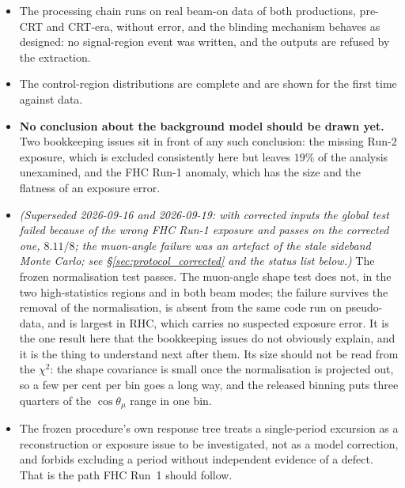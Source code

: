 \documentclass[11pt,a4paper]{article}
\begin{document}
\begin{itemize}\itemsep3pt
  \item The processing chain runs on real beam-on data of both productions, pre-CRT and
    CRT-era, without error, and the blinding mechanism behaves as designed: no
    signal-region event was written, and the outputs are refused by the extraction.
  \item The control-region distributions are complete and are shown for the first time
    against data.
  \item \textbf{No conclusion about the background model should be drawn yet.} Two
    bookkeeping issues sit in front of any such conclusion: the missing Run-2 exposure,
    which is excluded consistently here but leaves $19\%$ of the analysis unexamined, and
    the FHC Run-1 anomaly, which has the size and the flatness of an exposure error.
  \item \emph{(Superseded 2026-09-16 and 2026-09-19: with corrected inputs the global test failed because of the
    wrong FHC Run-1 exposure and passes on the corrected one, $8.11/8$; the muon-angle failure was an artefact of
    the stale sideband Monte Carlo; see \S\ref{sec:protocol_corrected} and the status list below.)} The frozen normalisation test passes. The muon-angle shape test does not, in the
    two high-statistics regions and in both beam modes; the failure survives the removal of
    the normalisation, is absent from the same code run on pseudo-data, and is largest in
    RHC, which carries no suspected exposure error. It is the one result here that the
    bookkeeping issues do not obviously explain, and it is the thing to understand next
    after them. Its size should not be read from the $\chi^2$: the shape covariance is
    small once the normalisation is projected out, so a few per cent per bin goes a long
    way, and the released binning puts three quarters of the $\cos\theta_\mu$ range in one
    bin.
  \item The frozen procedure's own response tree treats a single-period excursion as a
    reconstruction or exposure issue to be investigated, not as a model correction, and
    forbids excluding a period without independent evidence of a defect. That is the path
    FHC Run~1 should follow.
\end{itemize}
\end{document}
